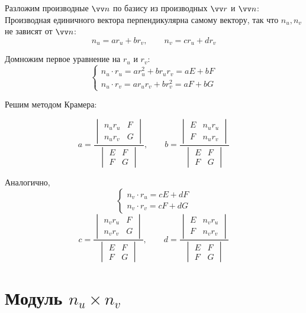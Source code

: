 Разложим производные $ \vv n $ по базису из производных $ \vv r $ и $ \vv n $: \\
Производная единичного вектора перпендикулярна самому вектору, так что $ n_u, n_v $ не зависят от $ \vv n $:
$$ \boxed{n_u = ar_u + br_v}, \qquad \boxed{n_v = cr_u + dr_v} $$

Домножим первое уравнение на $ r_u $ и $ r_v $:
$$
\begin{cases}
	n_u \cdot r_u = ar_u^2 + br_ur_v = aE + bF \\
	n_u \cdot r_v = ar_ur_v + br_v^2 = aF + bG
\end{cases} $$

Решим методом Крамера:

$$ a = \frac{
	\begin{vmatrix}
		n_ur_u & F \\
		n_ur_v & G
	\end{vmatrix}}{
	\begin{vmatrix}
		E & F \\
		F & G
	\end{vmatrix}}, \qquad b = \frac{
	\begin{vmatrix}
		E & n_ur_u \\
		F & n_ur_v
	\end{vmatrix}}{
	\begin{vmatrix}
		E & F \\
		F & G
	\end{vmatrix}} $$

Аналогично,
$$
\begin{cases}
	n_v \cdot r_u = cE + dF \\
	n_v \cdot r_v = cF + dG
\end{cases} $$
$$ c = \frac{
	\begin{vmatrix}
		n_vr_u & F \\
		n_vr_v & G
	\end{vmatrix}}{
	\begin{vmatrix}
		E & F \\
		F & G
	\end{vmatrix}}, \qquad d = \frac{
	\begin{vmatrix}
		E & n_vr_u \\
		F & n_vr_v
	\end{vmatrix}}{
	\begin{vmatrix}
		E & F \\
		F & G
	\end{vmatrix}} $$

\section{Модуль \texorpdfstring{$ n_u \times n_v $}{nu x nv}}

